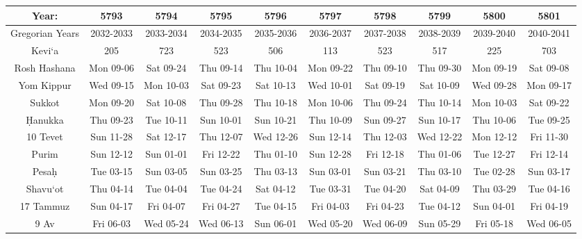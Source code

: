 \begin{footnotesize}
\begin{tabular}{c | c | c | c | c | c | c | c | c | c}
	Year:&5793&5794&5795&5796&5797&5798&5799&5800&5801\\\hline
	Gregorian Years&2032-2033&2033-2034&2034-2035&2035-2036&2036-2037&2037-2038&2038-2039&2039-2040&2040-2041\\\hline
	Kevi`a&205&723&523&506&113&523&517&225&703\\\hline
	Rosh Hashana&Mon 09-06&Sat 09-24&Thu 09-14&Thu 10-04&Mon 09-22&Thu 09-10&Thu 09-30&Mon 09-19&Sat 09-08\\\hline
	Yom Kippur&Wed 09-15&Mon 10-03&Sat 09-23&Sat 10-13&Wed 10-01&Sat 09-19&Sat 10-09&Wed 09-28&Mon 09-17\\\hline
	Sukkot&Mon 09-20&Sat 10-08&Thu 09-28&Thu 10-18&Mon 10-06&Thu 09-24&Thu 10-14&Mon 10-03&Sat 09-22\\\hline
	\d{H}anukka&Thu 09-23&Tue 10-11&Sun 10-01&Sun 10-21&Thu 10-09&Sun 09-27&Sun 10-17&Thu 10-06&Tue 09-25\\\hline
	10 Tevet&Sun 11-28&Sat 12-17&Thu 12-07&Wed 12-26&Sun 12-14&Thu 12-03&Wed 12-22&Mon 12-12&Fri 11-30\\\hline
	Purim&Sun 12-12&Sun 01-01&Fri 12-22&Thu 01-10&Sun 12-28&Fri 12-18&Thu 01-06&Tue 12-27&Fri 12-14\\\hline
	Pesa\d{h}&Tue 03-15&Sun 03-05&Sun 03-25&Thu 03-13&Sun 03-01&Sun 03-21&Thu 03-10&Tue 02-28&Sun 03-17\\\hline
	Shavu`ot&Thu 04-14&Tue 04-04&Tue 04-24&Sat 04-12&Tue 03-31&Tue 04-20&Sat 04-09&Thu 03-29&Tue 04-16\\\hline
	17 Tammuz&Sun 04-17&Fri 04-07&Fri 04-27&Tue 04-15&Fri 04-03&Fri 04-23&Tue 04-12&Sun 04-01&Fri 04-19\\\hline
	9 Av&Fri 06-03&Wed 05-24&Wed 06-13&Sun 06-01&Wed 05-20&Wed 06-09&Sun 05-29&Fri 05-18&Wed 06-05\\\hline
\end{tabular}\end{footnotesize}
